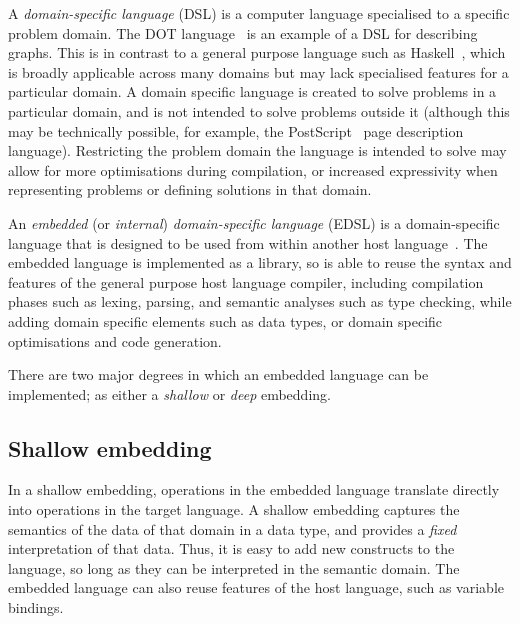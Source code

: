 A \emph{domain-specific language} (DSL) is a computer
language specialised to a specific problem domain. The DOT
language~\cite{Graphviz:1998ui,Ellson:2001wf} is an example of a DSL for
describing graphs. This is in contrast to a general purpose language such as
Haskell~\cite{Haskell:1998}, which is broadly applicable across many domains but
may lack specialised features for a particular domain. A domain specific
language is created to solve problems in a particular domain, and is not
intended to solve problems outside it (although this may be technically
possible, for example, the PostScript~\cite{AdobeSystemsIncorporated:1999ue}
page description language).
Restricting the problem domain the language is intended to solve may allow for
more optimisations during compilation, or increased expressivity when
representing problems or defining solutions in that domain.

An \emph{embedded} (or \emph{internal}) \emph{domain-specific
language}\lang[embedded]{} (EDSL) is a
domain-specific language that is designed to be used
from within another host language~\cite{Hudak:1996}\lang[host]{}. The embedded
language is implemented as a library, so is able to reuse the syntax and
features of the general purpose host language compiler, including compilation
phases such as lexing, parsing, and semantic analyses such as type checking,
while adding domain specific elements such as data types, or domain specific
optimisations and code generation.

There are two major degrees in which an embedded language can be implemented; as
either a \emph{shallow} or \emph{deep} embedding.

\subsection{Shallow embedding}

In a shallow embedding, operations in the embedded language translate directly
into operations in the target language. A shallow embedding captures the
semantics of the data of that domain in a data type, and provides a \emph{fixed}
interpretation of that data. Thus, it is easy to add new constructs to the
language, so long as they can be interpreted in the semantic domain. The
embedded language can also reuse features of the host language, such as variable
bindings.


